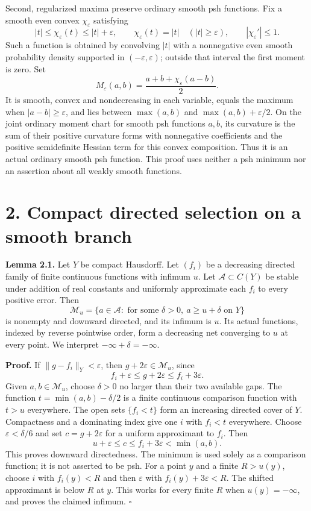 \documentclass[
  11pt,
]{article}
\begin{document}
Second, regularized maxima preserve ordinary smooth psh functions. Fix a
smooth even convex \(\chi_\varepsilon\) satisfying \[
|t|\leq\chi_\varepsilon(t)\leq |t|+\varepsilon,
\qquad \chi_\varepsilon(t)=|t|\quad (|t|\geq\varepsilon),
\qquad |\chi_\varepsilon'|\leq1.
\] Such a function is obtained by convolving \(|t|\) with a nonnegative
even smooth probability density supported in
\((-\varepsilon,\varepsilon)\); outside that interval the first moment
is zero. Set \[
M_\varepsilon(a,b)=\frac{a+b+\chi_\varepsilon(a-b)}2.
\] It is smooth, convex and nondecreasing in each variable, equals the
maximum when \(|a-b|\geq\varepsilon\), and lies between \(\max(a,b)\)
and \(\max(a,b)+\varepsilon/2\). On the joint ordinary moment chart for
smooth psh functions \(a,b\), its curvature is the sum of their positive
curvature forms with nonnegative coefficients and the positive
semidefinite Hessian term for this convex composition. Thus it is an
actual ordinary smooth psh function. This proof uses neither a psh
minimum nor an assertion about all weakly smooth functions.

\section{2. Compact directed selection on a smooth
branch}\label{compact-directed-selection-on-a-smooth-branch}

\textbf{Lemma 2.1.} Let \(Y\) be compact Hausdorff. Let \((f_i)\) be a
decreasing directed family of finite continuous functions with infimum
\(u\). Let \(\mathcal A\subset C(Y)\) be stable under addition of real
constants and uniformly approximate each \(f_i\) to every positive
error. Then \[
\mathcal M_u=\{a\in\mathcal A:\text{ for some }\delta>0,\ a\geq u+\delta\text{ on }Y\}
\] is nonempty and downward directed, and its infimum is \(u\). Its
actual functions, indexed by reverse pointwise order, form a decreasing
net converging to \(u\) at every point. We interpret
\(-\infty+\delta=-\infty\).

\textbf{Proof.} If \(\|g-f_i\|_Y<\varepsilon\), then
\(g+2\varepsilon\in\mathcal M_u\), since \[
f_i+\varepsilon\leq g+2\varepsilon\leq f_i+3\varepsilon.
\] Given \(a,b\in\mathcal M_u\), choose \(\delta>0\) no larger than
their two available gaps. The function \(t=\min(a,b)-\delta/2\) is a
finite continuous comparison function with \(t>u\) everywhere. The open
sets \(\{f_i<t\}\) form an increasing directed cover of \(Y\).
Compactness and a dominating index give one \(i\) with \(f_i<t\)
everywhere. Choose \(\varepsilon<\delta/6\) and set \(c=g+2\varepsilon\)
for a uniform approximant to \(f_i\). Then \[
u+\varepsilon\leq c\leq f_i+3\varepsilon<\min(a,b).
\] This proves downward directedness. The minimum is used solely as a
comparison function; it is not asserted to be psh. For a point \(y\) and
a finite \(R>u(y)\), choose \(i\) with \(f_i(y)<R\) and then
\(\varepsilon\) with \(f_i(y)+3\varepsilon<R\). The shifted approximant
is below \(R\) at \(y\). This works for every finite \(R\) when
\(u(y)=-\infty\), and proves the claimed infimum. \(\square\)
\end{document}
